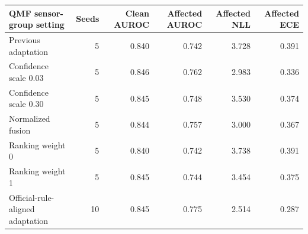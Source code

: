 \begin{tabular}{lrrrrr}
\toprule
QMF sensor-group setting & Seeds & Clean AUROC & Affected AUROC & Affected NLL & Affected ECE \\
\midrule
Previous adaptation & 5 & 0.840 & 0.742 & 3.728 & 0.391 \\
Confidence scale 0.03 & 5 & 0.846 & 0.762 & 2.983 & 0.336 \\
Confidence scale 0.30 & 5 & 0.845 & 0.748 & 3.530 & 0.374 \\
Normalized fusion & 5 & 0.844 & 0.757 & 3.000 & 0.367 \\
Ranking weight 0 & 5 & 0.840 & 0.742 & 3.738 & 0.391 \\
Ranking weight 1 & 5 & 0.845 & 0.744 & 3.454 & 0.375 \\
Official-rule-aligned adaptation & 10 & 0.845 & 0.775 & 2.514 & 0.287 \\
\bottomrule
\end{tabular}